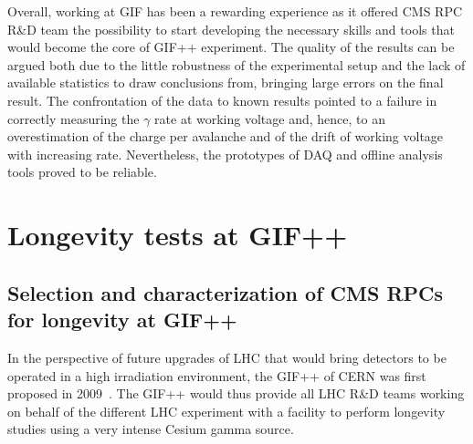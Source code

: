 	Overall, working at GIF has been a rewarding experience as it offered CMS RPC R\&D team the possibility to start developing the necessary skills and tools that would become the core of GIF++ experiment. The quality of the results can be argued both due to the little robustness of the experimental setup and the lack of available statistics to draw conclusions from, bringing large errors on the final result. The confrontation of the data to known results pointed to a failure in correctly measuring the $\gamma$ rate at working voltage and, hence, to an overestimation of the charge per avalanche and of the drift of working voltage with increasing rate. Nevertheless, the prototypes of DAQ and offline analysis tools proved to be reliable.

\section{Longevity tests at \acs{GIF++}}
\label{chapt5:sec:GIFpptests}

	\subsection{Selection and characterization of CMS RPCs for longevity at GIF++}
	\label{chapt5:ssec:selection}

	In the perspective of future upgrades of LHC that would bring detectors to be operated in a high irradiation environment, the \acl{GIF++} of CERN was first proposed in 2009~\cite{GIF++2009}. The GIF++ would thus provide all LHC R\&D teams working on behalf of the different LHC experiment with a facility to perform longevity studies using a very intense Cesium gamma source.
	
